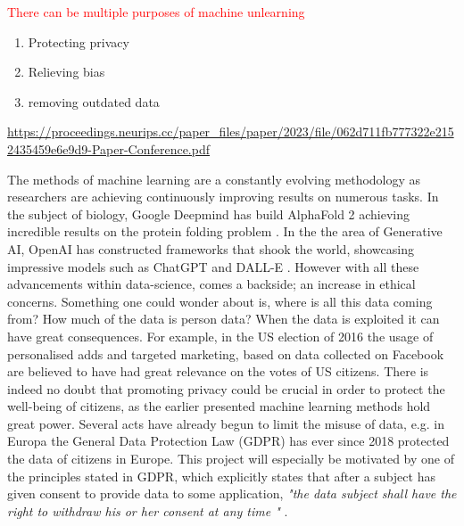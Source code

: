



\textcolor{red}{There can be multiple purposes of machine unlearning}
\begin{enumerate}
    \item Protecting privacy
    \item Relieving bias
    \item removing outdated data
\end{enumerate}
\url{https://proceedings.neurips.cc/paper_files/paper/2023/file/062d711fb777322e2152435459e6e9d9-Paper-Conference.pdf}





The methods of machine learning are a constantly evolving methodology as researchers are achieving continuously improving results on numerous tasks.  In the subject of biology, Google Deepmind has build AlphaFold 2 achieving incredible results on the protein folding problem \cite{jumper_highly_2021}. In the the area of Generative AI, OpenAI has constructed frameworks that shook the world, showcasing impressive models such as ChatGPT \cite{brown_language_2020} and DALL-E \cite{ramesh_zero-shot_2021}. However with all these advancements within data-science, comes a backside; an increase in ethical concerns. Something one could wonder about is, where is all this data coming from? How much of the data is person data? When the data is exploited it can have great consequences. For example, in the US election of 2016 the usage of personalised adds and targeted marketing, based on data collected on Facebook are believed to have had great relevance on the votes of US citizens. There is indeed no doubt that promoting privacy could be crucial in order to protect the well-being of citizens, as the earlier presented machine learning methods hold great power.  Several acts have already begun to limit the misuse of data, e.g. in Europa the General Data Protection Law (GDPR) has ever since 2018 protected the data of citizens in Europe. This project will especially be motivated by one of the principles stated in GDPR, which explicitly states that after a subject has given consent to provide data to some application, \textit{"the data subject shall have the right to withdraw his or her consent at any time "} \cite{noauthor_art_nodate}. 

\begin{comment}
\textit{The right to be forgotten} is something that has been introduced in 
\begin{itemize}
    \item European Union's General Data Protection Regulation (GDPR)
    \item The California Consumer Privacy Act (CCPA)
    \item The Act on the Protection of Personal Information (APPI)
    \item Canada's Consumer Privacy Protection Act (CPPA)
\end{itemize}
\end{comment}


